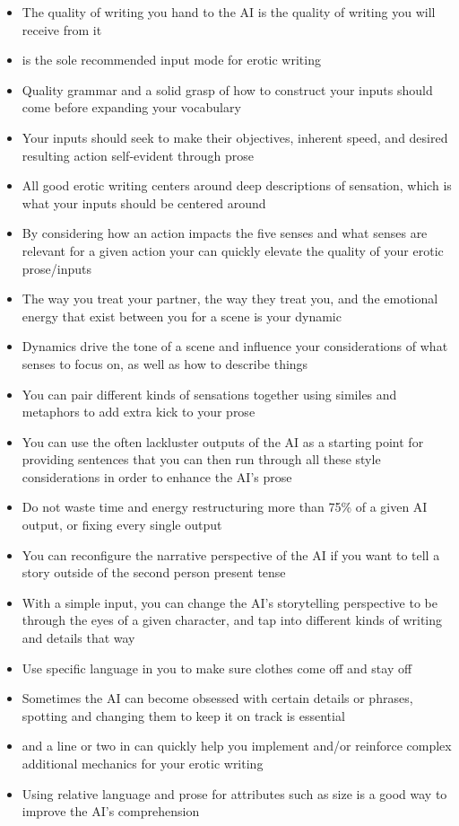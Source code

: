 ﻿\documentclass[Coomer-main.tex]{subfiles}
\begin{document}
\begin{itemize}
\item The quality of writing you hand to the AI is the quality of writing you will receive from it
\item \story is the sole recommended input mode for erotic writing
\item Quality grammar and a solid grasp of how to construct your inputs should come before expanding your vocabulary
\item Your inputs should seek to make their objectives, inherent speed, and desired resulting action self-evident through prose
\item All good erotic writing centers around deep descriptions of sensation, which is what your inputs should be centered around
\item By considering how an action impacts the five senses and what senses are relevant for a given action your can quickly elevate the quality of your erotic prose/inputs
\item The way you treat your partner, the way they treat you, and the emotional energy that exist between you for a scene is your dynamic
\item Dynamics drive the tone of a scene and influence your considerations of what senses to focus on, as well as how to describe things
\item You can pair different kinds of sensations together using similes and metaphors to add extra kick to your prose
\item You can use the often lackluster outputs of the AI as a starting point for providing sentences that you can then run through all these style considerations in order to enhance the AI's prose
\item Do not waste time and energy restructuring more than 75\% of a given AI output, or fixing every single output
\item You can reconfigure the narrative perspective of the AI if you want to tell a story outside of the second person present tense
\item With a simple input, you can change the AI's storytelling perspective to be through the eyes of a given character, and tap into different kinds of writing and details that way

\item Use specific language in you \rem to make sure clothes come off and stay off
\item Sometimes the AI can become obsessed with certain details or phrases, spotting and changing them to keep it on track is essential
\item \wi and a line or two in \rem can quickly help you implement and/or reinforce complex additional mechanics for your erotic writing
\item Using relative language and prose for attributes such as size is a good way to improve the AI’s comprehension

\end{itemize}
\end{document}
